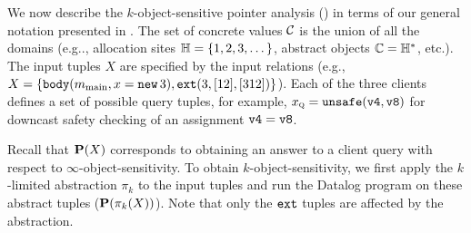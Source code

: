 
We now describe the $k$-object-sensitive pointer analysis () in terms of our general notation presented in .
The set of concrete values $\mathcal{C}$ is the union of all the domains
(e.g.., allocation sites ${\mathbb H} = \{ 1, 2, 3, \dots \}$, abstract objects ${\mathbb C} = {\mathbb H}^*$, etc.).
The input tuples $X$ are specified by the input relations
(e.g., $X = \{ \text{\tt body}(m_\text{main}, x = \text{\tt new}\,3), \text{\tt ext}(3,[12],[312]) \}$).
Each of the three clients defines a set of possible query tuples, for example,
$x_\text{\sc q} = \text{\tt unsafe}(\text{\tt v4},\text{\tt v8})$ for downcast safety checking of an assignment $\text{\tt v4} = \text{\tt v8}$.

Recall that $\mathbf{P}(X)$ corresponds to obtaining an answer to a client query with respect to $\infty$-object-sensitivity.
To obtain $k$-object-sensitivity,
we first apply the $k$-limited abstraction $\pi_k$ to the input tuples
and run the Datalog program on these abstract tuples ($\mathbf{P}(\pi_k(X))$).
Note that only the $\text{\tt ext}$ tuples are affected by the abstraction.
